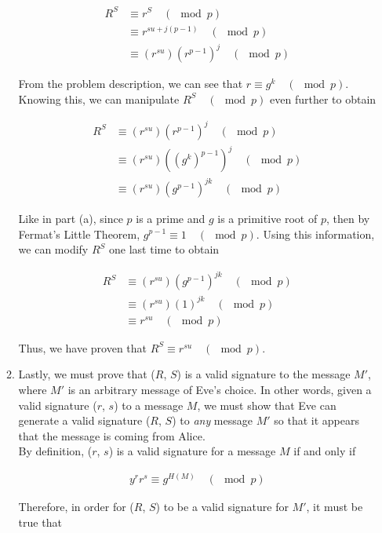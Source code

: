 \documentclass[11pt]{article}
\theoremstyle{definition}
\newcounter{problem}
\begin{document}
\begin{enumerate}
\begin{enumerate}
\begin{align*}
    R^S &\equiv r^S \quad (\mod{p}) \\ 
    &\equiv r^{su + j(p - 1)} \quad (\mod{p}) \\
    &\equiv (r^{su}) (r^{p - 1})^j \quad (\mod{p})
\end{align*}

From the problem description, we can see that $r \equiv g^k \quad (\mod{p})$. Knowing this, we can manipulate $R^S \quad (\mod{p})$ even further to obtain

\begin{align*}
    R^S &\equiv (r^{su}) (r^{p - 1})^j \quad (\mod{p}) \\
    &\equiv (r^{su}) ((g^k)^{p - 1})^j \quad (\mod{p}) \\
    &\equiv (r^{su}) (g^{p - 1})^{jk} \quad (\mod{p})
\end{align*}

Like in part (a), since $p$ is a prime and $g$ is a primitive root of $p$, then by Fermat's Little Theorem, $g^{p - 1} \equiv 1 \quad (\mod{p})$. Using this information, we can modify $R^S$ one last time to obtain

\begin{align*}
    R^S &\equiv (r^{su}) (g^{p - 1})^{jk} \quad (\mod{p}) \\
    &\equiv (r^{su}) (1)^{jk} \quad (\mod{p}) \\
    &\equiv r^{su} \quad (\mod{p})
\end{align*}

Thus, we have proven that $R^S \equiv r^{su} \quad (\mod{p})$.
\\

\item %
Lastly, we must prove that ($R$, $S$) is a valid signature to the message $M'$, where $M'$ is an arbitrary message of Eve's choice. In other words, given a valid signature ($r$, $s$) to a message $M$, we must show that Eve can generate a valid signature ($R$, $S$) to \textit{any} message $M'$ so that it appears that the message is coming from Alice. \\

By definition, ($r$, $s$) is a valid signature for a message $M$ if and only if 

\begin{align*}
    y^rr^s \equiv g^{H(M)} \quad (\mod{p})
\end{align*}

Therefore, in order for ($R$, $S$) to be a valid signature for $M'$, it must be true that


\end{enumerate}
\end{enumerate}
\end{document}
